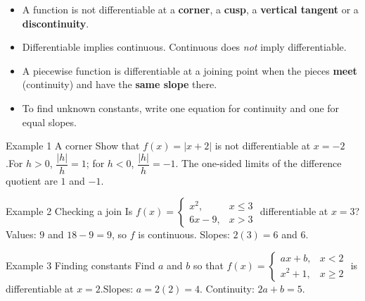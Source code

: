\documentclass[11pt]{article}
\begin{document}

\begin{ideabox}
\begin{itemize}[leftmargin=*,itemsep=2pt,topsep=2pt]
  \item A function is not differentiable at a \textbf{corner}, a \textbf{cusp}, a \textbf{vertical tangent} or a \textbf{discontinuity}.
  \item Differentiable implies continuous. Continuous does \emph{not} imply differentiable.
  \item A piecewise function is differentiable at a joining point when the pieces \textbf{meet} (continuity) and have the \textbf{same slope} there.
  \item To find unknown constants, write one equation for continuity and one for equal slopes.
\end{itemize}
\end{ideabox}

\begin{example}{Example 1 \textperiodcentered{} A corner}
Show that $f(x)=|x+2|$ is not differentiable at $x=-2$.\soln For $h>0$, $\dfrac{|h|}{h}=1$; for $h<0$, $\dfrac{|h|}{h}=-1$. The one-sided limits of the difference quotient are $1$ and $-1$.
\end{example}

\begin{example}{Example 2 \textperiodcentered{} Checking a join}
Is $f(x)=\begin{cases}x^2,&x\le3\\6x-9,&x>3\end{cases}$ differentiable at $x=3$?\soln Values: $9$ and $18-9=9$, so $f$ is continuous. Slopes: $2(3)=6$ and $6$.
\end{example}

\begin{example}{Example 3 \textperiodcentered{} Finding constants}
Find $a$ and $b$ so that $f(x)=\begin{cases}ax+b,&x<2\\x^2+1,&x\ge2\end{cases}$ is differentiable at $x=2$.\soln Slopes: $a=2(2)=4$. Continuity: $2a+b=5$.
\end{example}

\newpage
{}
\end{document}

